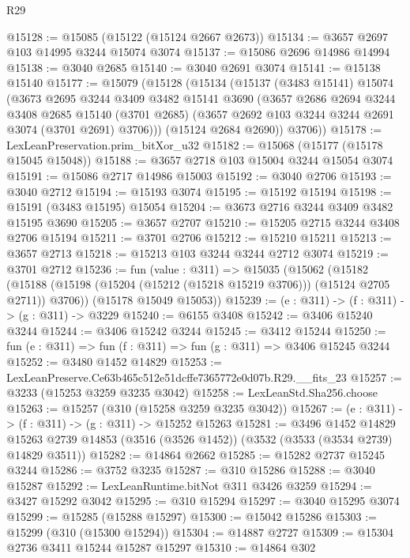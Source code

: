 \begin{lexlean}{R29}
\begin{coremodule}
@15128 := @15085 (@15122 (@15124 @2667 @2673))
@15134 := @3657 @2697 @103 @14995 @3244 @15074 @3074
@15137 := @15086 @2696 @14986 @14994
@15138 := @3040 @2685
@15140 := @3040 @2691 @3074
@15141 := @15138 @15140
@15177 := @15079
    (@15128
      (@15134
        (@15137
          (@3483 @15141)
          @15074
          (@3673
            @2695
            @3244
            @3409
            @3482
            @15141
            @3690
            (@3657
              @2686
              @2694
              @3244
              @3408
              @2685
              @15140
              (@3701 @2685)
              (@3657 @2692 @103 @3244 @3244 @2691 @3074 (@3701 @2691) @3706)))
          (@15124 @2684 @2690))
        @3706))
@15178 := LexLeanPreservation.prim_bitXor_u32
@15182 := @15068 (@15177 (@15178 @15045 @15048))
@15188 := @3657 @2718 @103 @15004 @3244 @15054 @3074
@15191 := @15086 @2717 @14986 @15003
@15192 := @3040 @2706
@15193 := @3040 @2712
@15194 := @15193 @3074
@15195 := @15192 @15194
@15198 := @15191 (@3483 @15195) @15054
@15204 := @3673 @2716 @3244 @3409 @3482 @15195 @3690
@15205 := @3657 @2707
@15210 := @15205 @2715 @3244 @3408 @2706 @15194
@15211 := @3701 @2706
@15212 := @15210 @15211
@15213 := @3657 @2713
@15218 := @15213 @103 @3244 @3244 @2712 @3074
@15219 := @3701 @2712
@15236 := fun (value : @311) =>
  @15035
    (@15062
      (@15182 (@15188 (@15198 (@15204 (@15212 (@15218 @15219 @3706))) (@15124 @2705 @2711)) @3706))
      (@15178 @15049 @15053))
@15239 := (e : @311) -> (f : @311) -> (g : @311) -> @3229
@15240 := @6155 @3408
@15242 := @3406 @15240 @3244
@15244 := @3406 @15242 @3244
@15245 := @3412 @15244
@15250 := fun (e : @311) => fun (f : @311) => fun (g : @311) => @3406 @15245 @3244
@15252 := @3480 @1452 @14829
@15253 := LexLeanPreserve.Ce63b465c512e51dcffe7365772e0d07b.R29.__fits_23
@15257 := @3233 (@15253 @3259 @3235 @3042)
@15258 := LexLeanStd.Sha256.choose
@15263 := @15257 (@310 (@15258 @3259 @3235 @3042))
@15267 := (e : @311) -> (f : @311) -> (g : @311) -> @15252 @15263
@15281 := @3496
    @1452
    @14829
    @15263
    @2739
    @14853
    (@3516 (@3526 @1452))
    (@3532 (@3533 (@3534 @2739) @14829 @3511))
@15282 := @14864 @2662
@15285 := @15282 @2737 @15245 @3244
@15286 := @3752 @3235
@15287 := @310 @15286
@15288 := @3040 @15287
@15292 := LexLeanRuntime.bitNot @311 @3426 @3259
@15294 := @3427 @15292 @3042
@15295 := @310 @15294
@15297 := @3040 @15295 @3074
@15299 := @15285 (@15288 @15297)
@15300 := @15042 @15286
@15303 := @15299 (@310 (@15300 @15294))
@15304 := @14887 @2727
@15309 := @15304 @2736 @3411 @15244 @15287 @15297
@15310 := @14864 @302

\end{coremodule}
\end{lexlean}
